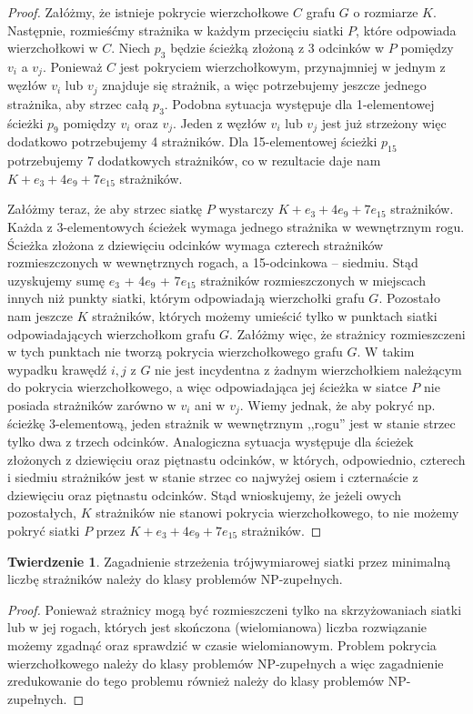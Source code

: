 \documentclass[brudnopis]{xmgr}
\theoremstyle{definition}
\newtheorem{Twierdzenie}{Twierdzenie}
\begin{document}
\begin{proof} 
	Załóżmy, że istnieje pokrycie wierzchołkowe $C$ grafu $G$ o rozmiarze $K$. Następnie, rozmieśćmy strażnika w każdym przecięciu siatki $P$, które odpowiada wierzchołkowi w $C$.
	Niech $p_3$ będzie ścieżką złożoną z 3 odcinków w $P$ pomiędzy $v_i$ a $v_j$. Ponieważ $C$ jest pokryciem wierzchołkowym, przynajmniej w jednym z węzłów $v_i$ lub $v_j$ znajduje się strażnik, a więc potrzebujemy jeszcze jednego strażnika, aby strzec całą $p_3$. Podobna sytuacja występuje dla 1-elementowej ścieżki $p_9$ pomiędzy $v_i$ oraz $v_j$. Jeden z węzłów $v_i$ lub $v_j$ jest już strzeżony więc dodatkowo potrzebujemy 4 strażników. Dla 15-elementowej ścieżki $p_{15}$ potrzebujemy 7 dodatkowych strażników, co w rezultacie daje nam $K + e_3 + 4e_9 + 7e_{15}$ strażników.

	\indent Załóżmy teraz, że aby strzec siatkę $P$ wystarczy $K + e_3 + 4e_9 + 7e_{15}$ strażników. Każda z 3-elementowych ścieżek wymaga jednego strażnika w wewnętrznym rogu. Ścieżka złożona z dziewięciu odcinków wymaga czterech strażników rozmieszczonych w wewnętrznych rogach, a 15-odcinkowa -- siedmiu. Stąd uzyskujemy sumę $e_3$ + 4$e_9$ + 7$e_{15}$ strażników rozmieszczonych w miejscach innych niż punkty siatki, którym odpowiadają wierzchołki grafu $G$. Pozostało nam jeszcze $K$ strażników, których możemy umieścić tylko w punktach siatki odpowiadających wierzchołkom grafu $G$. Załóżmy więc, że strażnicy rozmieszczeni w tych punktach nie tworzą pokrycia wierzchołkowego grafu $G$. W takim wypadku krawędź ${i, j}$ z $G$ nie jest incydentna z żadnym wierzchołkiem należącym do pokrycia wierzchołkowego, a więc odpowiadająca jej ścieżka w siatce $P$ nie posiada strażników zarówno w $v_i$ ani w $v_j$. Wiemy jednak, że aby pokryć np. ścieżkę 3-elementową, jeden strażnik w wewnętrznym ,,rogu'' jest w stanie strzec tylko dwa z trzech odcinków. Analogiczna sytuacja występuje dla ścieżek złożonych z dziewięciu oraz piętnastu odcinków, w których, odpowiednio, czterech i siedmiu strażników jest w stanie strzec co najwyżej osiem i czternaście z dziewięciu oraz piętnastu odcinków. Stąd wnioskujemy, że jeżeli owych pozostałych, $K$ strażników nie stanowi pokrycia wierzchołkowego, to nie możemy pokryć siatki $P$ przez $K + e_3 + 4e_9 + 7e_{15}$ strażników. 
\end{proof}

\begin{Twierdzenie}\cite{ntafos}
	Zagadnienie strzeżenia trójwymiarowej siatki przez minimalną liczbę strażników należy do klasy problemów NP-zupełnych.
\end{Twierdzenie}
\begin{proof} 
	Ponieważ strażnicy mogą być rozmieszczeni tylko na skrzyżowaniach siatki lub w jej rogach, których jest skończona (wielomianowa) liczba rozwiązanie możemy zgadnąć oraz sprawdzić w czasie wielomianowym. Problem pokrycia wierzchołkowego należy do klasy problemów NP-zupełnych a więc zagadnienie zredukowanie do tego problemu również należy do klasy problemów NP-zupełnych.
\end{proof}
\end{document}
